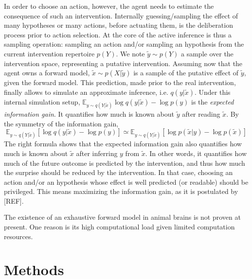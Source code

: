 \documentclass[runningheads]{llncs}
\begin{document}
In order to choose an action, however, the agent needs to estimate the consequence of such an intervention. Internally guessing/sampling the effect of many hypotheses or many actions, before actuating them, is the deliberation process prior to action selection. 
At the core of the active inference is thus a sampling operation: sampling an action and/or sampling an hypothesis from the current intervention repertoire $p(Y)$.  We note $\tilde{y}\sim p(Y)$ a sample over the  intervention space, representing a putative intervention. Assuming now that the agent owns a forward model, $\tilde{x}\sim p(X|\tilde{y})$ is a sample of the putative effect of $\tilde{y}$, given the forward model.
This prediction, made prior to the real intervention, finally allows to simulate an approximate inference, i.e. $q(y|\tilde{x})$. Under this internal simulation setup, $\mathbb{E}_{y \sim q(Y|\tilde{x})}\log q(y|\tilde{x}) - \log p(y)$ is the \emph{expected information gain}. It quantifies how much is known about $\tilde{y}$ after reading $\tilde{x}$. By the symmetry of the information gain, 
$$\mathbb{E}_{y \sim q(Y|\tilde{x})}[\log q(y|\tilde{x}) - \log p(y)]
\simeq \mathbb{E}_{y \sim q(Y|\tilde{x})}[\log p(\tilde{x}|y) - \log p(\tilde{x})]$$
The right formula shows that the expected information gain also quantifies how much is known about $\tilde{x}$ after inferring $y$ from  $\tilde{x}$. 
In other words, it quantifies how much of the future outcome is predicted by the intervention, and thus how much the surprise should be reduced by the intervention. In that case, choosing an action and/or an hypothesis whose effect is well predicted (or readable) should be privileged. This means maximizing the information gain, as it is postulated by [REF]. 

The existence of an exhaustive forward model in animal brains is not proven at present. One reason is its high computational load given  limited computation resources.  


\section{Methods}



%
%
%


\end{document}
